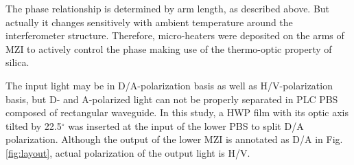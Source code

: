 \documentclass[letterpaper, 10pt]{article}
\begin{document}
The phase relationship is determined by arm length, as described above.
But actually it changes sensitively with ambient temperature around the interferometer structure.
Therefore, micro-heaters were deposited on the arms of MZI to actively control the phase making use of the thermo-optic property of silica.

The input light may be in D/A-polarization basis as well as H/V-polarization basis, but D- and A-polarized light can not be properly separated in PLC PBS composed of rectangular waveguide.
In this study, a HWP film with its optic axis tilted by 22.5$^\circ$ was inserted at the input of the lower PBS to split D/A polarization.
Although the output of the lower MZI is annotated as D/A in Fig. \ref{fig:layout}, actual polarization of the output light is H/V.

\end{document}
